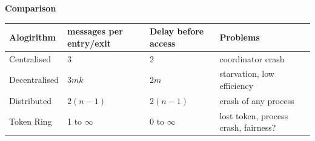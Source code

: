 \documentclass[ngerman,a4paper]{report}
\begin{document}
\textbf{Comparison}
\begin{tabular} {l|l|l|l}
Alogirithm&messages per entry/exit&Delay before access&Problems\\
\hline
Centralised& 3& 2&coordinator crash\\
Decentralised&$3mk$&$2m$&starvation, low efficiency\\
Distributed&$2(n-1)$&$2(n-1)$&crash of any process\\
Token Ring& 1 to $\infty$&$0$ to $\infty$&lost token, process crash, fairness?
\end{tabular}
\end{document}
